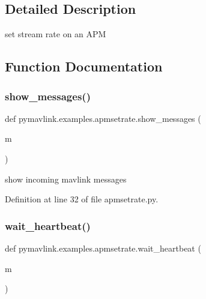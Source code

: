 \subsection{Detailed Description}
\begin{DoxyVerb}set stream rate on an APM
\end{DoxyVerb}
 

\subsection{Function Documentation}
\mbox{\label{namespacepymavlink_1_1examples_1_1apmsetrate_a81e07c39f713646c60c7a22474c50b3f}} 
\subsubsection{\texorpdfstring{show\_messages()}{show\_messages()}}
{\footnotesize\ttfamily def pymavlink.\+examples.\+apmsetrate.\+show\+\_\+messages (\begin{DoxyParamCaption}\item[{}]{m }\end{DoxyParamCaption})}

\begin{DoxyVerb}show incoming mavlink messages\end{DoxyVerb}
 

Definition at line 32 of file apmsetrate.\+py.

\mbox{\label{namespacepymavlink_1_1examples_1_1apmsetrate_a7411701774159f385cda1fd908922db8}} 
\subsubsection{\texorpdfstring{wait\_heartbeat()}{wait\_heartbeat()}}
{\footnotesize\ttfamily def pymavlink.\+examples.\+apmsetrate.\+wait\+\_\+heartbeat (\begin{DoxyParamCaption}\item[{}]{m }\end{DoxyParamCaption})}

